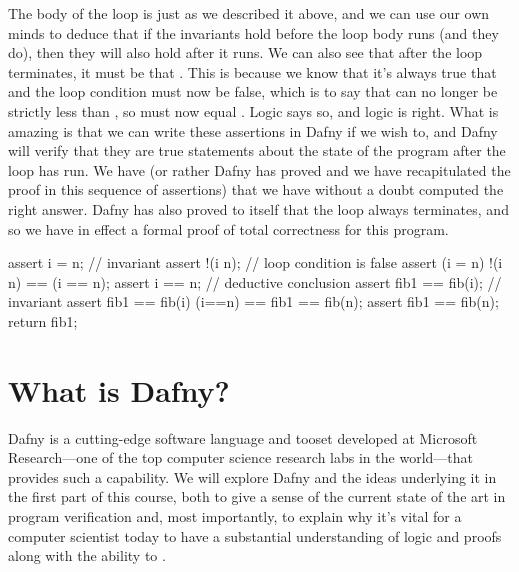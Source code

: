 \documentclass[letterpaper,10pt,english]{sphinxmanual}
\begin{document}
The body of the loop is just as we described it above, and we can use
our own minds to deduce that if the invariants hold before the loop
body runs (and they do), then they will also hold after it runs. We
can also see that after the loop terminates, it must be that .
This is because we know that it’s always true that  and the
loop condition must now be false, which is to say that  can no
longer be strictly less than , so  must now equal . Logic
says so, and logic is right. What is amazing is that we can write
these assertions in Dafny if we wish to, and Dafny will verify that
they are true statements about the state of the program after the
loop has run. We have  (or rather Dafny has proved and we
have recapitulated the proof in this sequence of assertions) that
we have without a doubt computed the right answer. Dafny has also
proved to itself that the loop always terminates, and so we have
in effect a formal proof of total correctness for this program.

\begin{sphinxVerbatim}[commandchars=\\\{\}]
assert i \PYGZlt{}= n;      // invariant
assert !(i \PYGZlt{} n);    // loop condition is false
assert (i \PYGZlt{}= n) \PYGZam{}\PYGZam{} !(i \PYGZlt{} n) ==\PYGZgt{} (i == n);
assert i == n;      // deductive conclusion
assert fib1 == fib(i); // invariant
assert fib1 == fib(i) \PYGZam{}\PYGZam{} (i==n) ==\PYGZgt{} fib1 == fib(n);
assert fib1 == fib(n);
return fib1;
\end{sphinxVerbatim}


\section{What is Dafny?}
\label{\detokenize{05-putting-it-together:what-is-dafny}}
Dafny is a cutting-edge software language and tooset developed at
Microsoft Research—one of the top computer science research labs in
the world—that provides such a capability. We will explore Dafny and
the ideas underlying it in the first part of this course, both to give
a sense of the current state of the art in program verification and,
most importantly, to explain why it’s vital for a computer scientist
today to have a substantial understanding of logic and proofs along
with the ability to .
\end{document}
